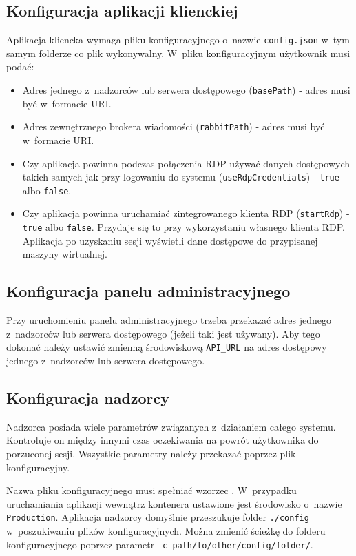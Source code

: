 \documentclass[../opis-rozwiazania.tex]{subfiles}
\begin{document}
\subsection{Konfiguracja aplikacji klienckiej}
Aplikacja kliencka wymaga pliku konfiguracyjnego o~nazwie \texttt{config.json} w~tym samym folderze co plik wykonywalny.
W~pliku konfiguracyjnym użytkownik musi podać:
\begin{itemize}
  \item Adres jednego z~nadzorców lub serwera dostępowego (\texttt{basePath}) - adres musi być w~formacie URI.
  \item Adres zewnętrznego brokera wiadomości (\texttt{rabbitPath}) - adres musi być w~formacie URI.
  \item Czy aplikacja powinna podczas połączenia RDP używać danych dostępowych takich samych jak przy logowaniu do systemu (\texttt{useRdpCredentials}) - \texttt{true} albo \texttt{false}.
  \item Czy aplikacja powinna uruchamiać zintegrowanego klienta RDP (\texttt{startRdp}) - \texttt{true} albo \texttt{false}. Przydaje się to przy wykorzystaniu własnego klienta RDP. Aplikacja po uzyskaniu sesji wyświetli dane dostępowe do przypisanej maszyny wirtualnej.
\end{itemize}

\subsection{Konfiguracja panelu administracyjnego}
\label{system_startup.admin_panel_conf}
Przy uruchomieniu panelu administracyjnego trzeba przekazać adres jednego z~nadzorców lub serwera dostępowego (jeżeli taki jest używany).
Aby tego dokonać należy ustawić zmienną środowiskową \texttt{API\_URL} na adres dostępowy jednego z~nadzorców lub serwera dostępowego.

\subsection{Konfiguracja nadzorcy}
\label{system_startup.overseer_conf}
Nadzorca posiada wiele parametrów związanych z~działaniem całego systemu.
Kontroluje on między innymi czas oczekiwania na powrót użytkownika do porzuconej sesji.
Wszystkie parametry należy przekazać poprzez plik konfiguracyjny.

Nazwa pliku konfiguracyjnego musi spełniać wzorzec \texttt{}.
W~przypadku uruchamiania aplikacji wewnątrz kontenera ustawione jest środowisko o~nazwie \texttt{Production}.
Aplikacja nadzorcy domyślnie przeszukuje folder \texttt{./config} w~poszukiwaniu plików konfiguracyjnych.
Można zmienić ścieżkę do folderu konfiguracyjnego poprzez parametr \texttt{-c path/to/other/config/folder/}.
\end{document}
